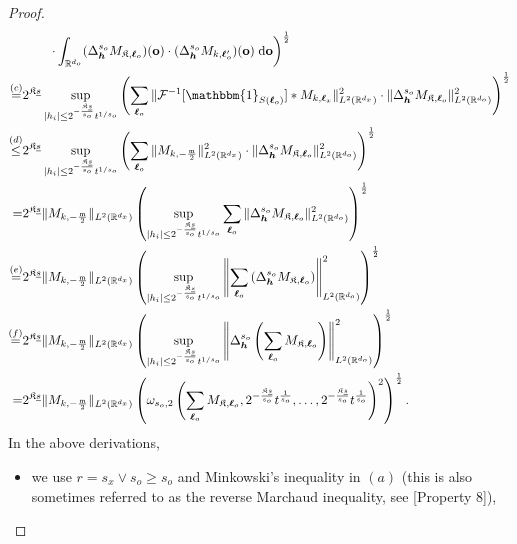 \documentclass[11pt]{article}
\newcommand{\one}{\mathbbm{1}}
\newcommand{\bo}{\mathbf o}
\newcommand{\calF}{\mathcal{F}}
\newcommand{\bl}{{\boldsymbol\ell}}
\newcommand{\0}{\mathbf{0}}
\newcommand{\bh}{\boldsymbol{h}}
\begin{document}
\begin{appendix}
\begin{proof}
\begin{align*}
    &\qquad \left. \cdot \int_{\mathbb{R}^{d_o}}(\Delta^{s_o}_{\bh}M_{\mathfrak{K},\bl_o})(\bo)\cdot (\Delta^{s_o}_{\bh}M_{k,\bl_o'})(\bo) \;\mathrm{d}\bo\right)^{\frac{1}{2}}\\
    \stackrel{(c)}{=}& 2^{\mathfrak{K}\underline{s}}\sup_{|h_i|\leq 2^{-\frac{\mathfrak{K}\underline{s}}{s_o}}t^{1/s_o}}\left(\sum_{\bl_o}\|\calF^{-1}[\one_{S(\bl_o)}] \ast M_{k,\bl_x}\|^2_{L^2(\mathbb{R}^{d_x})} \cdot \|\Delta^{s_o}_{\bh}M_{\mathfrak{K},\bl_o}\|^2_{L^2(\mathbb{R}^{d_o})}\right)^{\frac{1}{2}}\\
    \stackrel{(d)}{\leq} & 2^{\mathfrak{K}\underline{s}}\sup_{|h_i|\leq 2^{-\frac{\mathfrak{K}\underline{s}}{s_o}}t^{1/s_o}}\left(\sum_{\bl_o}\|M_{k,-\frac{\mathfrak{m}}{2}}\|^2_{L^2(\mathbb{R}^{d_x})} \cdot \|\Delta^{s_o}_{\bh}M_{\mathfrak{K},\bl_o}\|^2_{L^2(\mathbb{R}^{d_o})}\right)^{\frac{1}{2}}\\
    = & 2^{\mathfrak{K}\underline{s}}\|M_{k,-\frac{\mathfrak{m}}{2}}\|_{L^2(\mathbb{R}^{d_x})}\left( \sup_{|h_i|\leq 2^{-\frac{\mathfrak{K}\underline{s}}{s_o}} t^{1/s_o}}\sum_{\bl_o}\|\Delta^{s_o}_{\bh}M_{\mathfrak{K},\bl_o}\|^2_{L^2(\mathbb{R}^{d_o})}\right)^{\frac{1}{2}}\\
    \stackrel{(e)}{=} & 2^{\mathfrak{K}\underline{s}}\|M_{k,-\frac{\mathfrak{m}}{2}}\|_{L^2(\mathbb{R}^{d_x})}\left( \sup_{|h_i|\leq 2^{-\frac{\mathfrak{K}\underline{s}}{s_o}} t^{1/s_o}}\left\|\sum_{\bl_o}\left(\Delta^{s_o}_{\bh}M_{\mathfrak{K},\bl_o}\right)\right\|^2_{L^2(\mathbb{R}^{d_o})}\right)^{\frac{1}{2}}\\
    \stackrel{(f)}{=} & 2^{\mathfrak{K}\underline{s}}\|M_{k,-\frac{\mathfrak{m}}{2}}\|_{L^2(\mathbb{R}^{d_x})}\left( \sup_{|h_i|\leq 2^{-\frac{\mathfrak{K}\underline{s}}{s_o}} t^{1/s_o}}\left\|\Delta^{s_o}_{\bh}\left(\sum_{\bl_o}M_{\mathfrak{K},\bl_o}\right)\right\|^2_{L^2(\mathbb{R}^{d_o})}\right)^{\frac{1}{2}}\\
    = &2^{\mathfrak{K}\underline{s}}\|M_{k,-\frac{\mathfrak{m}}{2}}\|_{L^2(\mathbb{R}^{d_x})}\left(\omega_{s_o,2}\left(\sum_{\bl_o}M_{\mathfrak{K},\bl_o},2^{-\frac{\mathfrak{K}\underline{s}}{s_o}}t^{\frac{1}{s_o}},\dots,2^{-\frac{\mathfrak{K}\underline{s}}{s_o}}t^{\frac{1}{s_o}}\right)^2\right)^{\frac{1}{2}}.
\end{align*}
In the above derivations,
\begin{itemize}
    \item we use $r=s_x\vee s_o \geq s_o$ and Minkowski's inequality in $(a)$ (this is also sometimes referred to as the reverse Marchaud inequality, see \cite{KOLOMOITSEV2020105423}[Property 8]),

\end{itemize}
\end{proof}
\end{appendix}
\end{document}
